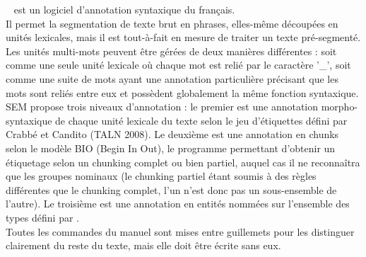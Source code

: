 \documentclass[manual-fr.tex]{subfiles}
\begin{document}
\SEMFull\ \cite{Tellier_demo2012} est un logiciel d'annotation syntaxique du français.\\

Il permet la segmentation de texte brut en phrases, elles-même découpées en unités lexicales, mais il est tout-à-fait en mesure de traiter un texte
pré-segmenté. Les unités multi-mots peuvent être gérées de deux manières différentes : soit comme une seule unité lexicale où chaque mot est relié
par le caractère '\_', soit comme une suite de mots ayant une annotation particulière précisant que les mots sont reliés entre eux et possèdent
globalement la même fonction syntaxique.\\

SEM propose trois niveaux d'annotation : le premier est une annotation morpho-syntaxique de chaque unité lexicale du texte selon le jeu
d'étiquettes défini par Crabbé et Candito (TALN 2008). Le deuxième est une annotation en chunks selon le modèle BIO (Begin In Out), le programme
permettant d'obtenir un étiquetage selon un chunking complet ou bien partiel, auquel cas il ne reconnaîtra que les groupes nominaux (le chunking
partiel étant soumis à des règles différentes que le chunking complet, l'un n'est donc pas un sous-ensemble de l'autre). Le troisième est une annotation en entités nommées sur l'ensemble des types défini par \cite{sagot2012annotation}.\\

Toutes les commandes du manuel sont mises entre guillemets pour les distinguer clairement du reste du texte, mais elle doit être écrite sans eux.
\end{document}
